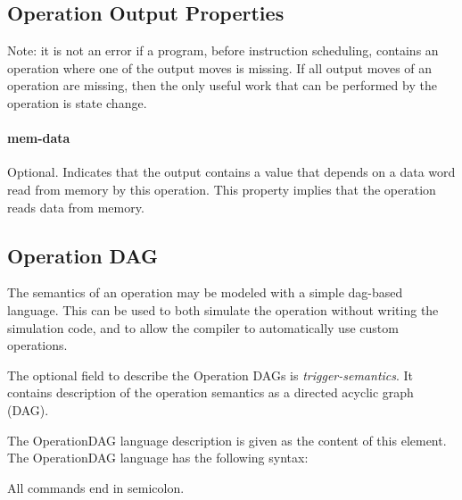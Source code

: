 \documentclass[a4paper,twoside]{tceusermanual}
\begin{document}
\subsection{Operation Output Properties}
\label{ssec:opoutput-properties}

Note: it is not an error if a program, before instruction scheduling,
contains an operation where one of the output moves is missing. If all
output moves of an operation are missing, then the only useful work that can
be performed by the operation is state change.

\paragraph{mem-data}
Optional.  Indicates that the output contains a value that depends on a
data word read from memory by this operation.  This property implies that
the operation reads data from memory.

\subsection{Operation DAG}
\label{ssec:operation-dag}

The semantics of an operation may be modeled with a simple dag-based language.
This can be used to both simulate the operation without writing the 
simulation code, and to allow the compiler to automatically use custom
operations.

The optional field to describe the Operation DAGs is 
\textit{trigger-semantics}. It contains description of the operation 
semantics as a directed acyclic graph (DAG). 

The OperationDAG language description is given as the content of this element.
The OperationDAG language has the following syntax:

All commands end in semicolon.
\end{document}

